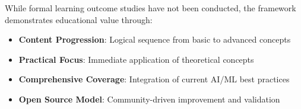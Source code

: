 While formal learning outcome studies have not been conducted, the framework demonstrates educational value through:

\begin{itemize}
    \item \textbf{Content Progression}: Logical sequence from basic to advanced concepts
    \item \textbf{Practical Focus}: Immediate application of theoretical concepts
    \item \textbf{Comprehensive Coverage}: Integration of current AI/ML best practices
    \item \textbf{Open Source Model}: Community-driven improvement and validation
\end{itemize}